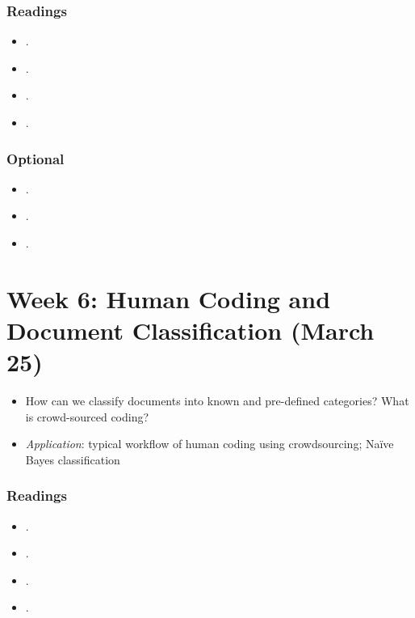\documentclass[abstract=on,parskip=full,headings=standardclasses,fontsize=11pt,paper=a4]{scrartcl}
\begin{document}
\subsubsection*{Readings}
\begin{itemize}
\item {}.
\item {}.
\item {}.
\item {}.
\end{itemize}

\subsubsection*{Optional}
\begin{itemize}
\item {}.
\item {}.
\item {}.
\end{itemize}


\section{Week 6: Human Coding and Document Classification (March 25)}

\begin{itemize}
\renewcommand\labelitemi{--}
\item How can we classify documents into known and pre-defined categories? What is crowd-sourced coding?
\item \textit{Application}: typical workflow of human coding using crowdsourcing; Naïve Bayes classification
\end{itemize}

\subsubsection*{Readings}
\begin{itemize}
\item {}.
\item {}.
\item {}.
\item {}.
\end{itemize}
\end{document}
